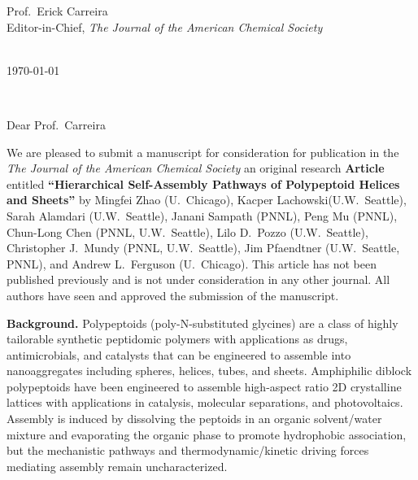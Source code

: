 \documentclass[11pt,a4paper]{letter} %
\makeatletter
\def\opening#1{\thispagestyle{empty}
{\centering\fromaddress \vspace{1.1in} \\ %
%
\hspace*{4.15 in}\today\hspace*{\fill}\par
} %
{\raggedright \toname \\ \toaddress \par} %
\vspace{0.05in} %
\noindent #1 %
}
\makeatother
\begin{document}

\begin{letter}
{
Prof.\ Erick Carreira \\
Editor-in-Chief, \textit{The Journal of the American Chemical Society}
}


\opening{Dear Prof.\ Carreira}

We are pleased to submit a manuscript for consideration for publication in the \textit{The Journal of the American Chemical Society} an original research \textbf{Article} entitled \textbf{``Hierarchical Self-Assembly Pathways of Polypeptoid Helices and Sheets''} by Mingfei Zhao (U.~Chicago), Kacper Lachowski(U.W.~Seattle), Sarah Alamdari (U.W.~Seattle), Janani Sampath (PNNL),  Peng Mu (PNNL), Chun-Long Chen (PNNL, U.W.~Seattle), Lilo D.\ Pozzo (U.W.~Seattle), Christopher J.\ Mundy (PNNL, U.W.~Seattle), Jim Pfaendtner (U.W.~Seattle, PNNL), and Andrew L.\ Ferguson (U.~Chicago). This article has not been published previously and is not under consideration in any other journal. All authors have seen and approved the submission of the manuscript.


\textbf{Background.} Polypeptoids (poly-N-substituted glycines) are a class of highly tailorable synthetic peptidomic polymers with applications as drugs, antimicrobials, and catalysts that can be engineered to assemble into nanoaggregates including spheres, helices, tubes, and sheets. Amphiphilic diblock polypeptoids have been engineered to assemble high-aspect ratio 2D crystalline lattices with applications in catalysis, molecular separations, and photovoltaics. Assembly is induced by dissolving the peptoids in an organic solvent/water mixture and evaporating the organic phase to promote hydrophobic association, but the mechanistic pathways and thermodynamic/kinetic driving forces mediating assembly remain uncharacterized.


\end{letter}
\end{document}
